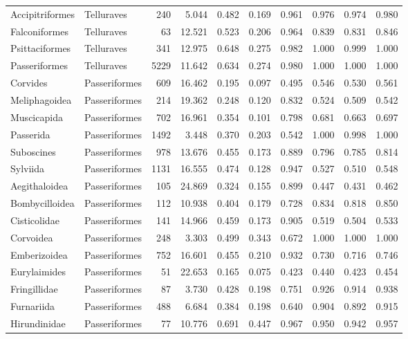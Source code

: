 \begin{table}[ht]
\begin{tabular}{llrrrrrrrr}
  Accipitriformes & Telluraves &  240 & 5.044 & 0.482 & 0.169 & 0.961 & 0.976 & 0.974 & 0.980 \\ 
  Falconiformes & Telluraves &   63 & 12.521 & 0.523 & 0.206 & 0.964 & 0.839 & 0.831 & 0.846 \\ 
  Psittaciformes & Telluraves &  341 & 12.975 & 0.648 & 0.275 & 0.982 & 1.000 & 0.999 & 1.000 \\ 
  Passeriformes & Telluraves & 5229 & 11.642 & 0.634 & 0.274 & 0.980 & 1.000 & 1.000 & 1.000 \\ 
  Corvides & Passeriformes &  609 & 16.462 & 0.195 & 0.097 & 0.495 & 0.546 & 0.530 & 0.561 \\ 
  Meliphagoidea & Passeriformes &  214 & 19.362 & 0.248 & 0.120 & 0.832 & 0.524 & 0.509 & 0.542 \\ 
  Muscicapida & Passeriformes &  702 & 16.961 & 0.354 & 0.101 & 0.798 & 0.681 & 0.663 & 0.697 \\ 
  Passerida & Passeriformes & 1492 & 3.448 & 0.370 & 0.203 & 0.542 & 1.000 & 0.998 & 1.000 \\ 
  Suboscines & Passeriformes &  978 & 13.676 & 0.455 & 0.173 & 0.889 & 0.796 & 0.785 & 0.814 \\ 
  Sylviida & Passeriformes & 1131 & 16.555 & 0.474 & 0.128 & 0.947 & 0.527 & 0.510 & 0.548 \\ 
  Aegithaloidea & Passeriformes &  105 & 24.869 & 0.324 & 0.155 & 0.899 & 0.447 & 0.431 & 0.462 \\ 
  Bombycilloidea & Passeriformes &  112 & 10.938 & 0.404 & 0.179 & 0.728 & 0.834 & 0.818 & 0.850 \\ 
  Cisticolidae & Passeriformes &  141 & 14.966 & 0.459 & 0.173 & 0.905 & 0.519 & 0.504 & 0.533 \\ 
  Corvoidea & Passeriformes &  248 & 3.303 & 0.499 & 0.343 & 0.672 & 1.000 & 1.000 & 1.000 \\ 
  Emberizoidea & Passeriformes &  752 & 16.601 & 0.455 & 0.210 & 0.932 & 0.730 & 0.716 & 0.746 \\ 
  Eurylaimides & Passeriformes &   51 & 22.653 & 0.165 & 0.075 & 0.423 & 0.440 & 0.423 & 0.454 \\ 
  Fringillidae & Passeriformes &   87 & 3.730 & 0.428 & 0.198 & 0.751 & 0.926 & 0.914 & 0.938 \\ 
  Furnariida & Passeriformes &  488 & 6.684 & 0.384 & 0.198 & 0.640 & 0.904 & 0.892 & 0.915 \\ 
  Hirundinidae & Passeriformes &   77 & 10.776 & 0.691 & 0.447 & 0.967 & 0.950 & 0.942 & 0.957 \\ 

\end{tabular}
\end{table}
